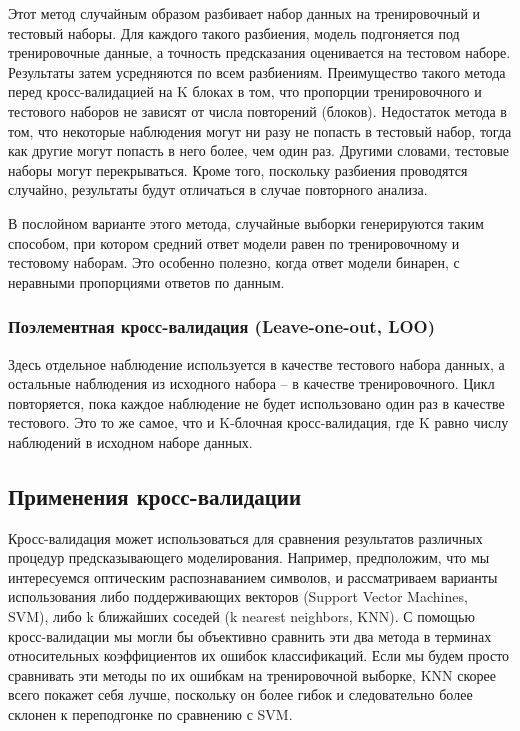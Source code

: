\documentclass[a4paper, 12pt]{article}
\theoremstyle{plain} %
\theoremstyle{definition} %
\theoremstyle{remark} %
\begin{document}
Этот метод случайным образом разбивает набор данных на тренировочный и тестовый наборы. Для каждого такого разбиения, модель подгоняется под тренировочные данные, а точность предсказания оценивается на тестовом наборе. Результаты затем усредняются по всем разбиениям. Преимущество такого метода перед кросс-валидацией на K блоках в том, что пропорции тренировочного и тестового наборов не зависят от числа повторений (блоков). Недостаток метода в том, что некоторые наблюдения могут ни разу не попасть в тестовый набор, тогда как другие могут попасть в него более, чем один раз. Другими словами, тестовые наборы могут перекрываться. Кроме того, поскольку разбиения проводятся случайно, результаты будут отличаться в случае повторного анализа.

В послойном варианте этого метода, случайные выборки генерируются таким способом, при котором средний ответ модели равен по тренировочному и тестовому наборам. Это особенно полезно, когда ответ модели бинарен, с неравными пропорциями ответов по данным.

\subsubsection{Поэлементная кросс-валидация (Leave-one-out, LOO)}

Здесь отдельное наблюдение используется в качестве тестового набора данных, а остальные наблюдения из исходного набора – в качестве тренировочного. Цикл повторяется, пока каждое наблюдение не будет использовано один раз в качестве тестового. Это то же самое, что и K-блочная кросс-валидация, где K равно числу наблюдений в исходном наборе данных.

\subsection{Применения кросс-валидации}

Кросс-валидация может использоваться для сравнения результатов различных процедур предсказывающего моделирования. Например, предположим, что мы интересуемся оптическим распознаванием символов, и рассматриваем варианты использования либо поддерживающих векторов (Support Vector Machines, SVM), либо k ближайших соседей (k nearest neighbors, KNN). С помощью кросс-валидации мы могли бы объективно сравнить эти два метода в терминах относительных коэффициентов их ошибок классификаций. Если мы будем просто сравнивать эти методы по их ошибкам на тренировочной выборке, KNN скорее всего покажет себя лучше, поскольку он более гибок и следовательно более склонен к переподгонке по сравнению с SVM.
\end{document}
